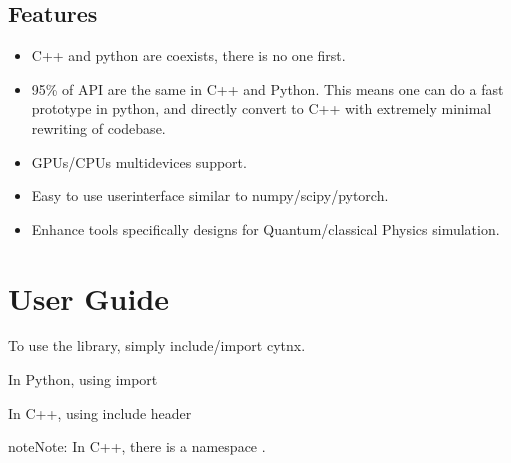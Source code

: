 \documentclass[letterpaper,10pt,english]{sphinxmanual}
\begin{document}
\section{Features}
\label{\detokenize{Intro:features}}\begin{itemize}
\item {} 
C++ and python are co\sphinxhyphen{}exists, there is no one first.

\item {} 
95\% of API are the same in C++ and Python.
This means one can do a fast prototype in python, and directly convert to C++ with extremely minimal re\sphinxhyphen{}writing of codebase.

\item {} 
GPUs/CPUs multi\sphinxhyphen{}devices support.

\item {} 
Easy to use user\sphinxhyphen{}interface similar to numpy/scipy/pytorch.

\item {} 
Enhance tools specifically designs for Quantum/classical Physics simulation.

\end{itemize}


\chapter{User Guide}
\label{\detokenize{Guide:user-guide}}\label{\detokenize{Guide::doc}}
To use the library, simply include/import cytnx.

In Python, using import

\begin{sphinxVerbatim}[commandchars=\\\{\},numbers=left,firstnumber=1,stepnumber=1]
 
\end{sphinxVerbatim}

In C++, using include header

\begin{sphinxVerbatim}[commandchars=\\\{\},numbers=left,firstnumber=1,stepnumber=1]
 
\end{sphinxVerbatim}

\begin{sphinxadmonition}{note}{Note:}
In C++, there is a namespace .
\end{sphinxadmonition}
\end{document}
